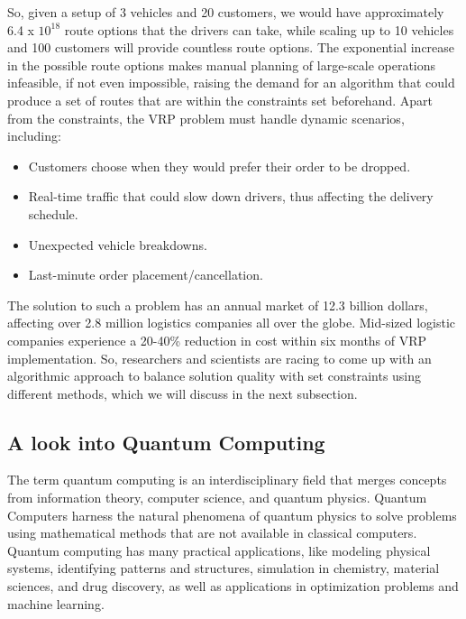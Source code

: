 \documentclass[a4paper]{report}
\begin{document}
{\begin{itemize}
So, given a setup of 3 vehicles and 20 customers, we would have approximately 6.4 x $10^{18}$ route options that the drivers can take, while scaling up to 10 vehicles and 100 customers will provide countless route options\cite{upperweb}. The exponential increase in the possible route options makes manual planning of large-scale operations infeasible, if not even impossible, raising the demand for an algorithm that could produce a set of routes that are within the constraints set beforehand. 
\newline
Apart from the constraints, the VRP problem must handle dynamic scenarios\cite{dynamicvrp}, including:
\begin{itemize}
    \item Customers choose when they would prefer their order to be dropped.
    \item Real-time traffic that could slow down drivers, thus affecting the delivery schedule.
    \item Unexpected vehicle breakdowns.
    \item Last-minute order placement/cancellation.
\end{itemize}



The solution to such a problem has an annual market of 12.3 billion dollars, affecting over 2.8 million logistics companies all over the globe. Mid-sized logistic companies experience a 20-40\% reduction in cost within six months of VRP implementation\cite{upperweb}. 
So, researchers and scientists are racing to come up with an algorithmic approach to balance solution quality with set constraints using different methods, which we will discuss in the next subsection.

\subsection{A look into Quantum Computing}
The term quantum computing is an interdisciplinary field that merges concepts from information theory, computer science, and quantum physics\cite{quantum}. Quantum Computers harness the natural phenomena of quantum physics to solve problems using mathematical methods that are not available in classical computers\cite{ibmQuantum}. 
Quantum computing has many practical applications, like modeling physical systems, identifying patterns and structures, simulation in chemistry, material sciences, and drug discovery, as well as applications in optimization problems and machine learning. 


\end{itemize}}
\end{document}
